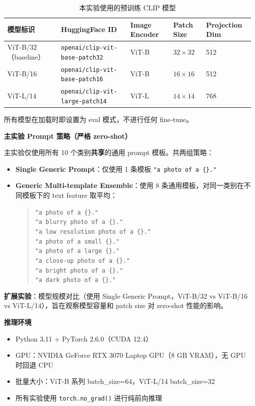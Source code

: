 \documentclass[12pt,a4paper]{ctexart}
\begin{document}
\begin{table}[H]
\centering
\caption{本实验使用的预训练 CLIP 模型}
\begin{tabular}{lllll}
\toprule
模型标识 & HuggingFace ID & Image Encoder & Patch Size & Projection Dim \\
\midrule
ViT-B/32（baseline）& \texttt{openai/clip-vit-base-patch32} & ViT-B & $32\times32$ & 512 \\
ViT-B/16            & \texttt{openai/clip-vit-base-patch16} & ViT-B & $16\times16$ & 512 \\
ViT-L/14            & \texttt{openai/clip-vit-large-patch14} & ViT-L & $14\times14$ & 768 \\
\bottomrule
\end{tabular}
\end{table}

所有模型在加载时即设置为 eval 模式，不进行任何 fine-tune。

\textbf{主实验 Prompt 策略（严格 zero-shot）}

主实验仅使用所有 10 个类别\textbf{共享}的通用 prompt 模板。共两组策略：

\begin{itemize}
    \item \textbf{Single Generic Prompt}：仅使用 1 条模板 \texttt{"a photo of a \{\}."}
    \item \textbf{Generic Multi-template Ensemble}：使用 8 条通用模板，对同一类别在不同模板下的 text feature 取平均：
    \begin{quote}
    \texttt{"a photo of a \{\}."}\\
    \texttt{"a blurry photo of a \{\}."}\\
    \texttt{"a low resolution photo of a \{\}."}\\
    \texttt{"a photo of a small \{\}."}\\
    \texttt{"a photo of a large \{\}."}\\
    \texttt{"a close-up photo of a \{\}."}\\
    \texttt{"a bright photo of a \{\}."}\\
    \texttt{"a dark photo of a \{\}."}
    \end{quote}
\end{itemize}

\textbf{扩展实验}：模型规模对比（使用 Single Generic Prompt，ViT-B/32 vs ViT-B/16 vs ViT-L/14），旨在观察模型容量和 patch size 对 zero-shot 性能的影响。

\textbf{推理环境}
\begin{itemize}
    \item Python 3.11 + PyTorch 2.6.0（CUDA 12.4）
    \item GPU：NVIDIA GeForce RTX 3070 Laptop GPU（8 GB VRAM），无 GPU 时回退 CPU
    \item 批量大小：ViT-B 系列 batch\_size=64，ViT-L/14 batch\_size=32
    \item 所有实验使用 \texttt{torch.no\_grad()} 进行纯前向推理
\end{itemize}
\end{document}
